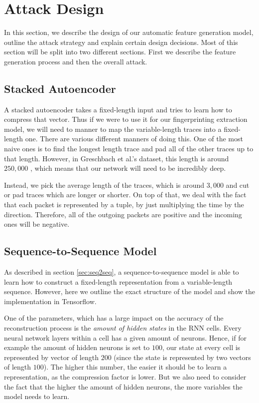 \chapter{Attack Design}

In this section, we describe the design of our automatic feature generation model, outline the attack strategy and explain certain design decisions.
Most of this section will be split into two different sections.
First we describe the feature generation process and then the overall attack.

\section{Stacked Autoencoder}

A stacked autoencoder takes a fixed-length input and tries to learn how to compress that vector.
Thus if we were to use it for our fingerprinting extraction model, we will need to manner to map the variable-length traces into a fixed-length one.
There are various different manners of doing this.
One of the most naive ones is to find the longest length trace and pad all of the other traces up to that length.
However, in Greschbach et al.'s dataset, this length is around $250,000$ \cite{greschbach2016effect}, which means that our network will need to be incredibly deep.

Instead, we pick the average length of the traces, which is around $3,000$ and cut or pad traces which are longer or shorter.
On top of that, we deal with the fact that each packet is represented by a tuple, by just multiplying the time by the direction.
Therefore, all of the outgoing packets are positive and the incoming ones will be negative.

\section{Sequence-to-Sequence Model}

As described in section \ref{sec:seq2seq}, a sequence-to-sequence model is able to learn how to construct a fixed-length representation from a variable-length sequence.
However, here we outline the exact structure of the model and show the implementation in Tensorflow.

One of the parameters, which has a large impact on the accuracy of the reconstruction process is the \textit{amount of hidden states} in the RNN cells.
Every neural network layers within a cell has a given amount of neurons.
Hence, if for example the amount of hidden neurons is set to $100$, our state at every cell is represented by vector of length $200$ (since the state is represented by two vectors of length $100$).
The higher this number, the easier it should be to learn a representation, as the compression factor is lower.
But we also need to consider the fact that the higher the amount of hidden neurons, the more variables the model needs to learn.

